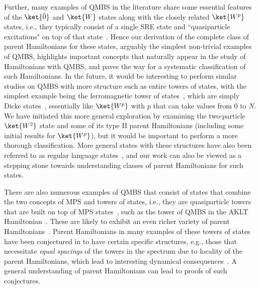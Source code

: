 \documentclass[prx,letterpaper,aps,superscriptaddress,floatfix,twocolumn,nofootinbib]{revtex4-2}
\theoremstyle{definition}
\begin{document}
%
Further, many examples of QMBS in the literature share some essential features of the $\ket{\bar{0}}$ and $\ket{W}$ states along with the closely related $\ket{W^p}$ states, i.e., they typically consist of a single SRE state and ``quasiparticle excitations" on top of that state~\cite{Moudgalya_2022, Chandran_2023}.
%
Hence our derivation of the complete class of parent Hamiltonians for these states, arguably the simplest non-trivial examples of QMBS, highlights important concepts that naturally appear in the study of Hamiltonians with QMBS, and paves the way for a systematic classification of such Hamiltonians. 
%
In the future, it would be interesting to perform similar studies on QMBS with more structure such as entire towers of states, with the simplest example being the ferromagnetic tower of states~\cite{Choi_2019, Mark2020Eta, moudgalya2023exhaustive}, which are simply Dicke states~\cite{Dicke1954Coherence,Bastin2009OperationalFamilies}, essentially like $\ket{W^p}$ with $p$ that can take values from $0$ to $N$.
%
We have initiated this more general exploration by examining the two-particle $\ket{W^2}$ state and some of its type II parent Hamiltonians (including some initial results for $\ket{W^p}$), but it would be important to perform a more thorough classification.
%
More general states with these structures have also been referred to as regular language states~\cite{florido2024regular}, and our work can also be viewed as a stepping stone towards understanding classes of parent Hamiltonians for such states. 
%

%
There are also numerous examples of QMBS that consist of states that combine the two concepts of MPS and towers of states, i.e., they are quasiparticle towers that are built on top of MPS states~\cite{Moudgalya2020Large}, such as the tower of QMBS in the AKLT Hamiltonian~\cite{Moudgalya_2018exact, Moudgalya_2018entanglement}.
%
These are likely to exhibit an even richer variety of parent Hamiltonians~\cite{mark2020unified,ren2021deformed, moudgalya2023exhaustive, wang2024generalizedspinhelixstates, zhang2025quantum}. 
%
Parent Hamiltonians in many examples of these towers of states have been conjectured in \cite{moudgalya2023exhaustive} to have certain specific structures, e.g., those that necessitate \textit{equal spacings} of the towers in the spectrum due to locality of the parent Hamiltonians, which lead to interesting dynamical consequences~\cite{alhambra2020revivals, Moudgalya_2022, odea2025entanglement}.
%
A general understanding of parent Hamiltonians can lead to proofs of such conjectures. 
%
\end{document}
